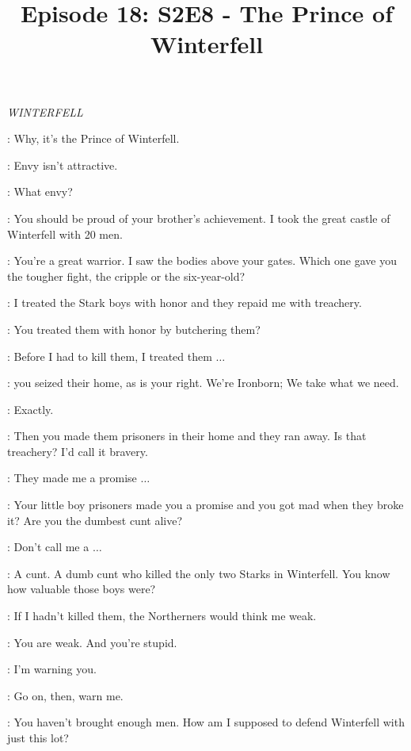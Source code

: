 

\title{Episode 18: S2E8 - The Prince of Winterfell}
\author{}
\date{}
\maketitle



\scene

\textit{WINTERFELL} 


\YARA: Why, it's the Prince of Winterfell. 

\THEON: Envy isn't attractive. 

\YARA: What envy? 

\THEON: You should be proud of your brother's achievement. I took the great castle of Winterfell with 20 men. 

\YARA: You're a great warrior. I saw the bodies above your gates. Which one gave you the tougher fight, the cripple or the six-year-old? 

\THEON: I treated the Stark boys with honor and they repaid me with treachery. 

\YARA: You treated them with honor by butchering them? 

\THEON: Before I had to kill them, I treated them $\ldots$ 

\YARA:  you seized their home, as is your right. We're Ironborn; We take what we need. 

\THEON: Exactly. 

\YARA: Then you made them prisoners in their home and they ran away. Is that treachery? I'd call it bravery. 

\THEON: They made me a promise $\ldots$  

\YARA: Your little boy prisoners made you a promise and you got mad when they broke it? Are you the dumbest cunt alive? 

\THEON: Don't call me a $\ldots$  

\YARA: A cunt. A dumb cunt who killed the only two Starks in Winterfell. You know how valuable those boys were? 

\THEON: If I hadn't killed them, the Northerners would think me weak. 

\YARA: You are weak. And you're stupid. 

\THEON: I'm warning you. 

\YARA: Go on, then, warn me. 

\THEON: You haven't brought enough men. How am I supposed to defend Winterfell with just this lot? 

